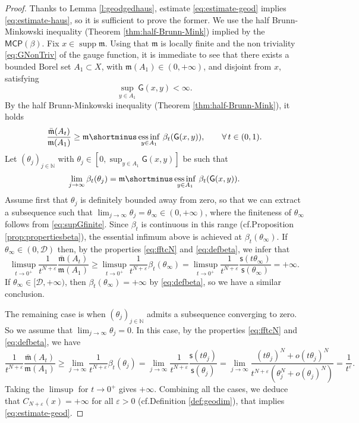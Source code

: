 \documentclass[11pt,a4paper]{article}
\theoremstyle{plain}
\theoremstyle{definition}
\theoremstyle{remark}
\numberwithin{equation}{section}
\newcommand{\N}{\mathbb{N}} %
\DeclareMathOperator{\supp}{\mathrm{supp}}
\newcommand{\ve}{\varepsilon}
\newcommand{\MCP}{\mathsf{MCP}}
\newcommand{\cD}{\mathcal{D}}
\newcommand{\sfs}{\mathsf{s}}
\DeclareMathOperator*{\essinf}{ess\,inf}
\newcommand{\mm}{\mathfrak m}
\newcommand{\sfG}{\mathsf G}
\begin{document}
\begin{proof}
Thanks to Lemma \ref{l:geodgedhaus}, estimate \eqref{eq:estimate-geod} implies \eqref{eq:estimate-haus}, so it is sufficient to prove the former. We use the half Brunn-Minkowski inequality (Theorem \ref{thm:half-Brunn-Mink}) implied by the $\MCP(\beta)$. 
Fix $x\in \supp\mm$. Using that $\mm$ is locally finite and the non triviality \eqref{eq:GNonTriv} of the gauge function, it is immediate to see that there exists a bounded Borel set $A_1\subset X$,  with $\mm(A_1) \in (0,+\infty)$, and disjoint from $x$, satisfying
\begin{equation}\label{eq:supGfinite}
\sup_{y\in A_1} \sfG(x,y)<\infty.
\end{equation}
By the half Brunn-Minkowski inequality (Theorem \ref{thm:half-Brunn-Mink}), it holds
\begin{equation}
\frac{\bar{\mm}(A_t)}{\mm(A_1)}\geq  \mm\shortminus\essinf_{y\in A_1} \,  \beta_t(\sfG(x,y)), \qquad \forall\, t \in (0,1).
\end{equation}
Let $(\theta_j)_{j\in \N}$ with $\theta_j \in [0,\sup_{y\in A_1}\sfG(x,y)]$ be such that
\begin{equation}
\lim_{j\to\infty} \beta_t(\theta_j) =  \mm\shortminus\essinf_{y\in A_1} \,\beta_t(\sfG(x,y)).
\end{equation}
Assume first that $\theta_j$ is definitely bounded away from zero, so that we can extract a subsequence such that $\lim_{j\to\infty}\theta_j = \theta_\infty \in  (0,+\infty)$, where the finiteness of $\theta_\infty$ follows from \eqref{eq:supGfinite}. Since $\beta_t$ is continuous in this range (cf.\@ Proposition \ref{prop:propertiesbeta}), the essential infimum above is achieved at $\beta_t(\theta_\infty)$. If $\theta_\infty \in (0,\cD)$ then, by the properties \eqref{eq:fftcN} and \eqref{eq:defbeta}, we infer that
\begin{equation}
\limsup_{t\to 0^+} \frac{1}{t^{N+\ve}} \frac{\bar{\mm}(A_t)}{\mm(A_1)} \geq  \limsup_{t\to 0^+} \frac{1}{t^{N+\ve}} \beta_t(\theta_\infty) = \limsup_{t\to 0^+} \frac{1}{t^{N+\ve}} \frac{\sfs(t\theta_\infty)}{\sfs(\theta_\infty)}=+\infty.
\end{equation}
If $\theta_{\infty} \in [\cD,+\infty)$, then  $\beta_t(\theta_\infty) =+\infty$  by \eqref{eq:defbeta}, so we have a similar conclusion.

The remaining case is when $(\theta_j)_{j\in\N}$ admits a subsequence converging to zero. So we assume that $\lim_{j\to \infty} \theta_j = 0$. In this case, by the properties \eqref{eq:fftcN} and  \eqref{eq:defbeta}, we have
\begin{equation}
\frac{1}{t^{N+\ve}} \frac{\bar{\mm}(A_t)}{\mm(A_1)} \geq  \lim_{j\to\infty} \frac{1}{t^{N+\ve}} \beta_t(\theta_j) = \lim_{j\to\infty} \frac{1}{t^{N+\ve}} \frac{\sfs(t\theta_j)}{\sfs(\theta_j)} =\lim_{j\to \infty}\frac{(t\theta_j)^N+o(t\theta_j)^N}{t^{N+\ve}\left(\theta_j^N+ o(\theta_j)^N\right)}= \frac{1}{t^{\ve}}.
\end{equation}
Taking the $\limsup$ for $t\to 0^+$ gives $+\infty$. Combining all the cases, we deduce that $C_{N+\varepsilon}(x) = +\infty$ for all $\varepsilon>0$ (cf.\@ Definition \ref{def:geodim}), that implies \eqref{eq:estimate-geod}.
\end{proof}
\end{document}
